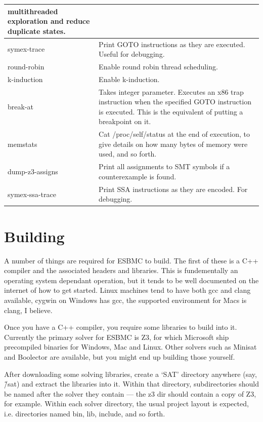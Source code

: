 \documentclass{article}
\begin{document}
\begin{longtable}{| p{} | p{} |}
multithreaded exploration and reduce duplicate states.\\
\hline
symex-trace & Print GOTO instructions as they are executed. Useful for
debugging.\\
\hline
round-robin & Enable round robin thread scheduling.\\
\hline
k-induction & Enable k-induction.\\
\hline
break-at & Takes integer parameter. Executes an x86 trap instruction when the
specified GOTO instruction is executed. This is the equivalent of putting a
breakpoint on it.\\
\hline
memstats & Cat /proc/self/status at the end of execution, to give details on
how many bytes of memory were used, and so forth.\\
\hline
dump-z3-assigns & Print all assignments to SMT symbols if a counterexample
is found.\\
\hline
symex-ssa-trace & Print SSA instructions as they are encoded. For debugging.\\
\hline
\end{longtable}

\section{Building}

A number of things are required for ESBMC to build. The first of these is a
C++ compiler and the associated headers and libraries. This is fundementally
an operating system dependant operation, but it tends to be well documented
on the internet of how to get started. Linux machines tend to have both gcc
and clang available, cygwin on Windows has gcc, the supported environment for
Macs is clang, I believe.

Once you have a C++ compiler, you require some libraries to build into it.
Currently the primary solver for ESBMC is Z3, for which Microsoft ship
precompiled binaries for Windows, Mac and Linux. Other solvers such as Minisat
and Boolector are available, but you might end up building those yourself.

After downloading some solving libraries, create a `SAT' directory anywhere
(say, \~/sat) and extract the libraries into it. Within that directory,
subdirectories should be named after the solver they contain --- the z3 dir
should contain a copy of Z3, for example. Within each solver directory, the
usual project layout is expected, i.e. directories named bin, lib, include,
and so forth.
\end{document}
